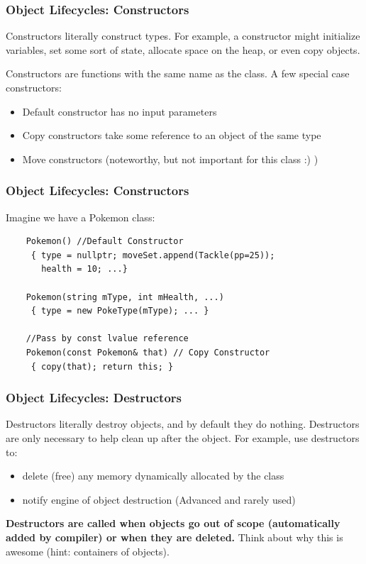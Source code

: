 \documentclass{beamer}
\begin{document}
\begin{frame}
    \frametitle{Object Lifecycles: Constructors}
    Constructors literally construct types. 
    For example, a constructor might initialize variables, set some sort of state, allocate space on the heap, or even copy objects.

    Constructors are functions with the same name as the class. A few special case constructors:
    \begin{itemize}
    \item Default constructor has no input parameters
    \item Copy constructors take some reference to an object of the same type
    \item Move constructors (noteworthy, but not important for this class :) )
    \end{itemize}


\end{frame}

\begin{frame}[fragile]
    \frametitle{Object Lifecycles: Constructors}
    Imagine we have a Pokemon class:
    \begin{verbatim}
    Pokemon() //Default Constructor
     { type = nullptr; moveSet.append(Tackle(pp=25)); 
       health = 10; ...}
    
    Pokemon(string mType, int mHealth, ...)
     { type = new PokeType(mType); ... }

    //Pass by const lvalue reference 
    Pokemon(const Pokemon& that) // Copy Constructor
     { copy(that); return this; }
    \end{verbatim}
\end{frame}

\begin{frame}
\frametitle{Object Lifecycles: Destructors}
    Destructors literally destroy objects, and by default they do nothing.
    Destructors are only necessary to help clean up after the object. 
    For example, use destructors to:
    \begin{itemize}
    \item delete (free) any memory dynamically allocated by the class
    \item notify engine of object destruction (Advanced and rarely used)
    \end{itemize}

    \textbf{Destructors are called when objects go out of scope (automatically added by compiler) or when they are deleted.}
    Think about why this is awesome (hint: containers of objects).
\end{frame}
\end{document}

